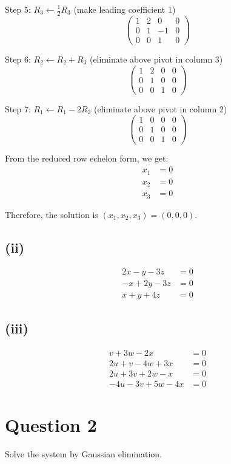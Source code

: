 \documentclass[12pt]{article}
\begin{document}
Step 5: $R_3 \leftarrow \frac{1}{2}R_3$ (make leading coefficient 1)
\[
\left(\begin{array}{ccc|c}
1 & 2 & 0 & 0\\
0 & 1 & -1 & 0\\
0 & 0 & 1 & 0
\end{array}\right)
\]

Step 6: $R_2 \leftarrow R_2 + R_3$ (eliminate above pivot in column 3)
\[
\left(\begin{array}{ccc|c}
1 & 2 & 0 & 0\\
0 & 1 & 0 & 0\\
0 & 0 & 1 & 0
\end{array}\right)
\]

Step 7: $R_1 \leftarrow R_1 - 2R_2$ (eliminate above pivot in column 2)
\[
\left(\begin{array}{ccc|c}
1 & 0 & 0 & 0\\
0 & 1 & 0 & 0\\
0 & 0 & 1 & 0
\end{array}\right)
\]

From the reduced row echelon form, we get:
\begin{align*}
x_1 &= 0\\
x_2 &= 0\\
x_3 &= 0
\end{align*}

Therefore, the solution is $\boxed{(x_1, x_2, x_3) = (0, 0, 0)}$.

\subsection*{(ii)}
\begin{align*}
2x - y - 3z &= 0\\
-x + 2y - 3z &= 0\\
x + y + 4z &= 0
\end{align*}

\subsection*{(iii)}
\begin{align*}
v + 3w - 2x &= 0\\
2u + v - 4w + 3x &= 0\\
2u + 3v + 2w - x &= 0\\
-4u - 3v + 5w - 4x &= 0
\end{align*}

\section*{Question 2}
Solve the system by Gaussian elimination.
\end{document}
